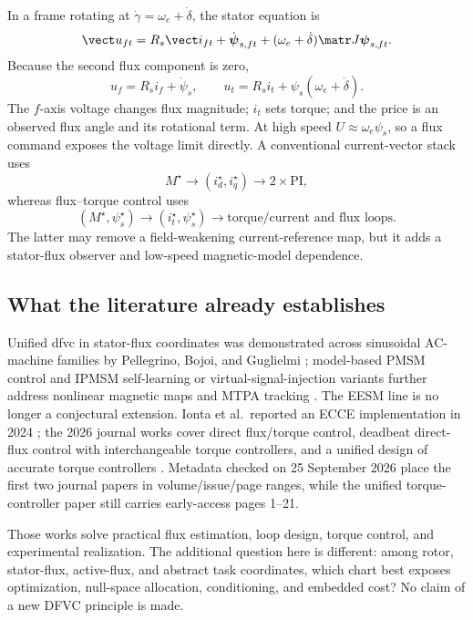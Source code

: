 In a frame rotating at
\(\dot\gamma=\omega_e+\dot\delta\), the stator equation is
\[
 \vect u_{ft}=R_s\vect i_{ft}+\dot{\boldsymbol\psi}_{s,ft}
 +(\omega_e+\dot\delta)\matr J\boldsymbol\psi_{s,ft}.
\]
Because the second flux component is zero,
\begin{equation}
 \boxed{u_f=R_si_f+\dot\psi_s},\qquad
 \boxed{u_t=R_si_t+\psi_s(\omega_e+\dot\delta)}.
 \label{eq:ft-voltage}
\end{equation}
The \(f\)-axis voltage changes flux magnitude; \(i_t\) sets torque; and the
price is an observed flux angle and its rotational term. At high speed
\(U\approx\omega_e\psi_s\), so a flux command exposes the voltage limit
directly. A conventional current-vector stack uses
\[
 M^\star\to(i_d^\star,i_q^\star)\to 2\times\mathrm{PI},
\]
whereas flux--torque control uses
\[
 (M^\star,\psi_s^\star)\to(i_t^\star,\psi_s^\star)
 \to\text{torque/current and flux loops}.
\]
The latter may remove a field-weakening current-reference map, but it adds a
stator-flux observer and low-speed magnetic-model dependence.

\subsection{What the literature already establishes}

Unified \gls{dfvc} in stator-flux coordinates was demonstrated across
sinusoidal AC-machine families by Pellegrino, Bojoi, and Guglielmi
\cite{pellegrino2011dfvc}; model-based PMSM control and IPMSM self-learning or
virtual-signal-injection variants further address nonlinear magnetic maps and
MTPA tracking \cite{boazzo2015dfvc,sun2016dfvc,sun2017selflearning}. The EESM
line is no longer a conjectural extension. Ionta et al.\ reported an ECCE
implementation in 2024 \cite{ionta2024dfvc}; the 2026 journal works cover
direct flux/torque control, deadbeat direct-flux control with interchangeable
torque controllers, and a unified design of accurate torque controllers
\cite{ionta2026dftc,rubino2026deadbeat,ionta2026unified}. Metadata checked on
25 September 2026 place the first two journal papers in volume/issue/page
ranges, while the unified torque-controller paper still carries early-access
pages 1--21.

Those works solve practical flux estimation, loop design, torque control, and
experimental realization. The additional question here is different: among
rotor, stator-flux, active-flux, and abstract task coordinates, which chart
best exposes optimization, null-space allocation, conditioning, and embedded
cost? No claim of a new DFVC principle is made.

